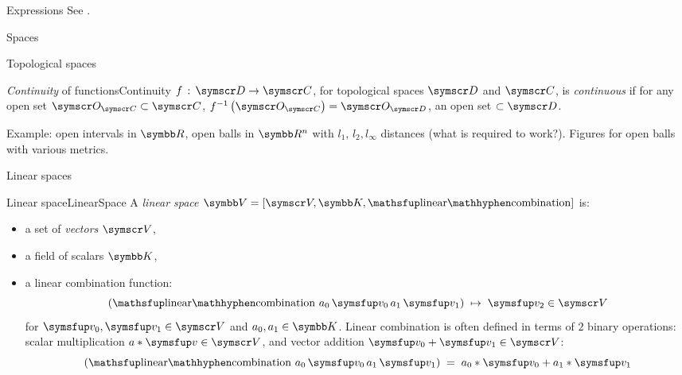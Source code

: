 \documentclass{PalisadesLakesArticle}
\begin{document}
\begin{plSection}{Expressions}
See 
.

\begin{plSection}{Spaces}
\begin{plSection}{Topological spaces}
\label{sec:Topological-spaces}

\begin{plDefinition}{\textsl{Continuity} of functions}{Continuity} 
$f \, : \, \Set{D} \rightarrow \Set{C}$,
for topological spaces $\Set{D}$ and $\Set{C}$,
is \textit{continuous}
if for any open set $\Set{O}_{\Set{C}} \subset \Set{C}$,
$f^{-1}\left( \Set{O}_{\Set{C}} \right) = 
\Set{O}_{\Set{D}}$, an open set $\subset \Set{D}$.

Example: open intervals in $\Space{R}$,
open balls in $\Space{R}^n$ with $l_1$, $l_2, l_{\infty}$ distances
(what is required to work?).
Figures for open balls with various metrics.
\end{plDefinition}%

\end{plSection}%
\begin{plSection}{Linear spaces}
\label{sec:Linear-spaces}

\begin{plDefinition}{Linear space}{LinearSpace}
A \textit{linear space} 
$\Space{V} = \left[ \Set{V}, \Space{K}, \linearCombination \right]$
 is:
\begin{itemize}
  \item a set of \textit{vectors} $\Set{V}$,
  \item a field  of scalars $\Space{K}$,
  \item a linear combination function: 
\begin{equation}
\left( \linearCombination 
\, a_0 \, \Vector{v}_0 \, a_1 \, \Vector{v}_1 \right) \; 
 \mapsto \; \Vector{v}_2  \in \Set{V}
\end{equation}
for $\Vector{v}_0, \Vector{v}_1 \in \Set{V} $
and $a_0, a_1 \in \Space{K}$.
Linear combination is often defined in terms of
$2$ binary operations:
scalar multiplication $a * \Vector{v} \in \Set{V}$,
and vector addition $\Vector{v}_0 + \Vector{v}_1 \in \Set{V}$:
\begin{equation}
\left( \linearCombination 
\, a_0 \, \Vector{v}_0 \, a_1 \, \Vector{v}_1 \right) \; 
= \; a_0*\Vector{v}_0 + a_1*\Vector{v}_1
\end{equation}
\end{itemize}
\end{plDefinition}


\end{plSection}
\end{plSection}
\end{plSection}
\end{document}
